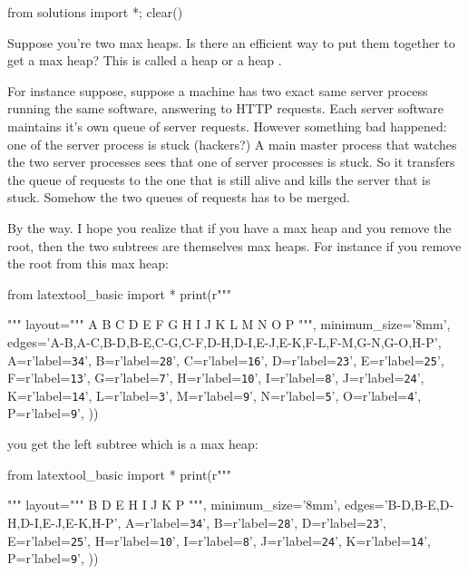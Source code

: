 \begin{python0}
from solutions import *; clear()
\end{python0}

Suppose you're two max heaps.
Is there an efficient way to put them together to get a max heap?
This is called a heap  or a heap .

For instance suppose, suppose a machine has
two exact same server process running the same software,
answering to HTTP requests.
Each server software maintains it's own queue of server requests.
However something bad happened: one of the server process is stuck
(hackers?)
A main master process that watches the two server processes
sees that one of server processes is stuck.
So it transfers the queue of requests to the one that is still alive
and kills the server that is stuck.
Somehow the two queues of requests has to be merged.

By the way.
I hope you realize that if you have a max heap and you remove the
root, then the two subtrees are themselves max heaps.
For instance if you remove the root from this max heap:

\begin{python}
from latextool_basic import *
print(r"""
\begin{center}
\end{center}
""" %
layout="""
        A 
    B       C 
  D   E   F   G
 H I J K L M N O
P
""",
minimum_size='8mm',
edges='A-B,A-C,B-D,B-E,C-G,C-F,D-H,D-I,E-J,E-K,F-L,F-M,G-N,G-O,H-P',
A=r'label=\texttt{34}',
B=r'label=\texttt{28}',
C=r'label=\texttt{16}',
D=r'label=\texttt{23}',
E=r'label=\texttt{25}',
F=r'label=\texttt{13}',
G=r'label=\texttt{7}',
H=r'label=\texttt{10}',
I=r'label=\texttt{8}',
J=r'label=\texttt{24}',
K=r'label=\texttt{14}',
L=r'label=\texttt{3}',
M=r'label=\texttt{9}',
N=r'label=\texttt{5}',
O=r'label=\texttt{4}',
P=r'label=\texttt{9}',
))
\end{python}

you get the left subtree which is a max heap:

\begin{python}
from latextool_basic import *
print(r"""
\begin{center}
\end{center}
""" %
layout="""
    B        
  D   E      
 H I J K 
P
""",
minimum_size='8mm',
edges='B-D,B-E,D-H,D-I,E-J,E-K,H-P',
A=r'label=\texttt{34}',
B=r'label=\texttt{28}',
D=r'label=\texttt{23}',
E=r'label=\texttt{25}',
H=r'label=\texttt{10}',
I=r'label=\texttt{8}',
J=r'label=\texttt{24}',
K=r'label=\texttt{14}',
P=r'label=\texttt{9}',
))
\end{python}

